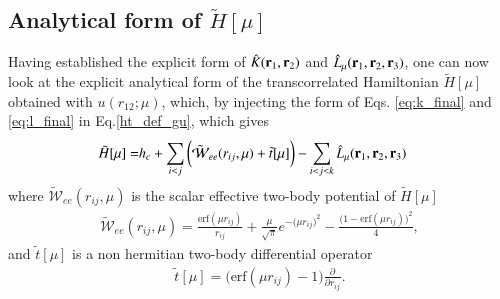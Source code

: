 \documentclass[aip,jcp,reprint,noshowkeys,superscriptaddress]{revtex4-1}
\newcommand{\deriv}[3]{\frac{\partial^{#3} #1}{\partial {#2}^{#3}}}
\newcommand{\bri}[1]{{\bf r}_{#1}}
\begin{document}
\subsection{Analytical form of $\tilde{H}[\mu]$}
Having established the explicit form of $\hat{K}(\bri{1},\bri{2})$ and $\hat{L}_\mu(\bri{1},\bri{2},\bri{3})$, one can now 
look at the explicit analytical form of the transcorrelated Hamiltonian $\tilde{H}[\mu]$ obtained with $u(r_{12};\mu)$,  
which, by injecting the form of Eqs. \eqref{eq:k_final} and \eqref{eq:l_final} in Eq.\eqref{ht_def_gu}, which gives
\begin{equation}
  \begin{aligned}
 \label{eq:exp_ht_mu}
   \tilde{H}[\mu] = & h_c + \sum_{i<j} \bigg( \tilde{\mathcal{W}}_{ee}(r_{ij},\mu) + \tilde{t}[\mu] \bigg) - \sum_{i<j<k} \hat{L}_\mu(\bri{1},\bri{2},\bri{3})
  \end{aligned}
\end{equation}
where $ \tilde{\mathcal{W}}_{ee}(r_{ij},\mu)$ is the scalar effective two-body potential of  $\tilde{H}[\mu]$
\begin{equation}
 \begin{aligned}
 \tilde{\mathcal{W}}_{ee}(r_{ij},\mu)  =  \frac{\text{erf}(\mu r_{ij})}{r_{ij}} + \frac{\mu}{\sqrt{\pi}} e^{-\big(\mu r_{ij} \big)^2} - \frac{\bigg(1 -     \text{erf}(\mu r_{ij}) \bigg)^2}{4}, 
 \end{aligned}
\end{equation}
and $\tilde{t}[\mu]$ is a non hermitian two-body differential operator 
\begin{equation}
 \begin{aligned}
 \tilde{t}[\mu] =  \bigg( \text{erf}(\mu r_{ij}) - 1\bigg) \deriv{}{r_{ij}}{}.
 \end{aligned}
\end{equation}
\end{document}
